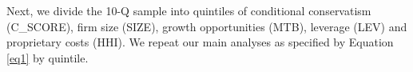 \documentclass[letterpaper,12pt]{article}
\begin{document}
\begin{spacing}{1.5}
\begin{comment}
&+\beta_7RET_{i,t}\times NEG_{i,t}\times SIZE_{i,t}+\beta_8RET_{i,t}\times NEG_{i,t}\times MTB_{i,t}+\beta_9RET_{i,t}\times NEG_{i,t}\times LEV_{i,t}\\
&+\beta_{10}SIZE_{i,t}+\beta_{11}MTB_{i,t}+\beta_{12}LEV_{i,t}\\
&+\beta_{13}NEG_{i,t}\times SIZE_{i,t}+\beta_{14}NEG_{i,t}\times MTB_{i,t}+\beta_{15}NEG_{i,t}\times LEV_{i,t}+ \epsilon_{i,t}
\end{split}
\end{equation}
We obtain the estimates from Equation (3) and use them to calculate C\_SCORE and G\_SCORE following Equation (4) and Equation (5) respectively. C\_SCORE captures the incremental timeliness of bad news and measures conditional conservatism, with more positive value being more conditionally conservative. G\_SCORE captures the timeliness of good news.
\begin{equation}\label{eq4}
C\_SCORE_{i,t} = \beta_6+\beta_7SIZE_{i,t}+\beta_8MTB_{i,t}+\beta_9LEV_{i,t}
\end{equation}
\begin{equation}\label{eq5}
G\_SCORE_{i,t} = \beta_2+\beta_3SIZE_{i,t}+\beta_4MTB_{i,t}+\beta_5LEV_{i,t}
\end{equation}

The mean and standard errors of coefficients obtained from \hyperref[eq3]{Equation (3)} and the summary statistics of C\_SCORE and G\_SCORE (see \hyperref[oat2]{Table 2 of Online Appendix}) are consistent with \citeA{khanEstimationEmpiricalProperties2009} overall. 
\end{comment}
Next, we divide the 10-Q sample into quintiles of conditional conservatism (C\_SCORE), firm size (SIZE), growth opportunities (MTB), leverage (LEV) and proprietary costs (HHI). We repeat our main analyses as specified by Equation \eqref{eq1} by quintile.


\end{spacing}
\end{document}
